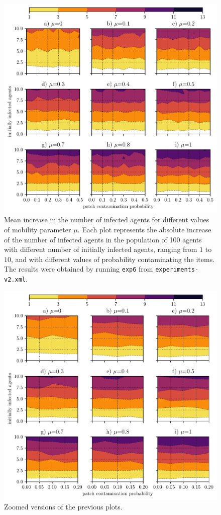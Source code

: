 \documentclass[11pt,a4paper]{article}
\begin{document}
\begin{figure}[ht!]
\includegraphics{plots/plot_exp6-full.pdf}
\caption{Mean increase in the number of infected agents for different values of mobility parameter $\mu$. Each plot represents the absolute increase of the number of infected agents in the population of 100 agents with different number of initially infected agents, ranging from $1$ to $10$,  and with different values of probability contaminating the items. The results were obtained by running \texttt{exp6} from \texttt{experiments-v2.xml}.}
\end{figure}

\begin{figure}[ht!]
\includegraphics{plots/plot_exp6-part.pdf}
\caption{Zoomed versions of the previous plots.}
\end{figure}
\end{document}
